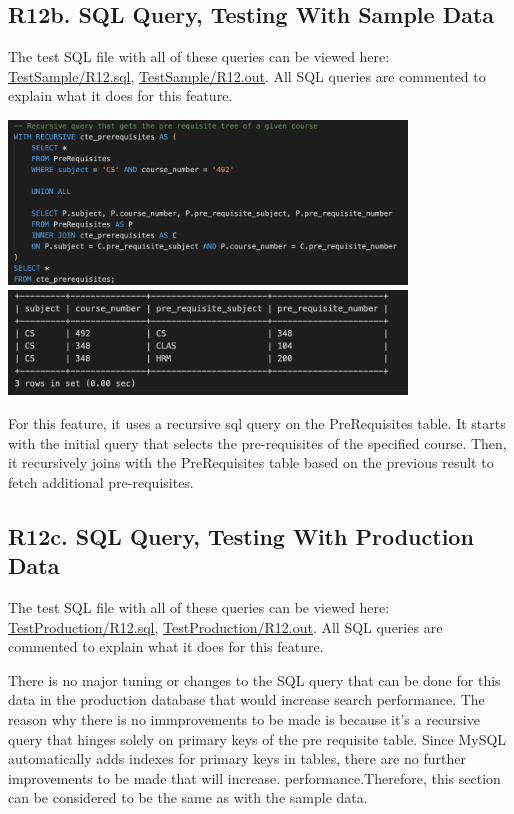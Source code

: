 \documentclass[12pt, a4paper]{article}
\begin{document}
\subsection*{R12b. SQL Query, Testing With Sample Data}
The test SQL file with all of these queries can be viewed here: \underline{\href{https://github.com/Kggupta/DegreeMap/tree/main/Database/Queries/TestSample}{TestSample/R12.sql}}, \underline{\href{https://github.com/Kggupta/DegreeMap/tree/main/Database/Queries/TestSample}{TestSample/R12.out}}. All SQL queries are commented to explain what it does for this feature.
\begin{center}
    \includegraphics[width=400px]{R12/q1}
    \includegraphics[width=400px]{R12/q1out}
\end{center}
For this feature, it uses a recursive sql query on the PreRequisites table. It starts with the initial query that selects the pre-requisites of the specified course. Then, it recursively joins with the PreRequisites table based on the previous result to fetch additional pre-requisites.
\subsection*{R12c. SQL Query, Testing With Production Data}
The test SQL file with all of these queries can be viewed here: \underline{\href{https://github.com/Kggupta/DegreeMap/tree/main/Database/Queries/TestProduction}{TestProduction/R12.sql}}, \underline{\href{https://github.com/Kggupta/DegreeMap/tree/main/Database/Queries/TestProduction}{TestProduction/R12.out}}. All SQL queries are commented to explain what it does for this feature.

There is no major tuning or changes to the SQL query that can be done for this data in the production database that would increase search performance. The reason why there is no immprovements to be made is because it's a recursive query that hinges solely on primary keys of the pre requisite table. Since MySQL automatically adds indexes for primary keys in tables, there are no further improvements to be made that will increase. performance.Therefore, this section can be considered to be the same as with the sample data.
\end{document}
